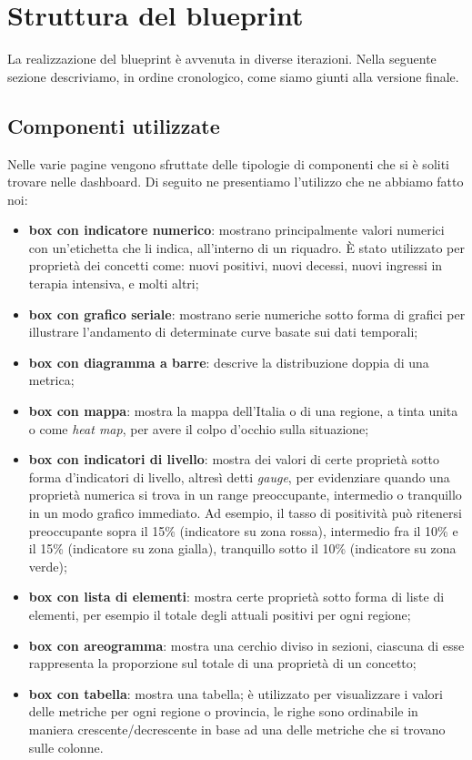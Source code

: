 \section{Struttura del blueprint}\label{s:struttura-blueprint}
La realizzazione del blueprint è avvenuta in diverse iterazioni. Nella seguente sezione descriviamo, in ordine cronologico, come siamo giunti alla versione finale.

\subsection{Componenti utilizzate}\label{ss:componenti-utilizzate}
Nelle varie pagine vengono sfruttate delle tipologie di componenti che si è soliti trovare nelle dashboard. Di seguito ne presentiamo l'utilizzo che ne abbiamo fatto noi:
\begin{itemize}
    \item \textbf{box con indicatore numerico}: mostrano principalmente valori numerici con un'etichetta che li indica, all'interno di un riquadro. È stato utilizzato per proprietà dei concetti come: nuovi positivi, nuovi decessi, nuovi ingressi in terapia intensiva, e molti altri;
    \item \textbf{box con grafico seriale}: mostrano serie numeriche sotto forma di grafici per illustrare l'andamento di determinate curve basate sui dati temporali;
    \item \textbf{box con diagramma a barre}: descrive la distribuzione doppia di una metrica;
    \item \textbf{box con mappa}: mostra la mappa dell'Italia o di una regione, a tinta unita o come \textit{heat map}, per avere il colpo d'occhio sulla situazione;
    \item \textbf{box con indicatori di livello}: mostra dei valori di certe proprietà sotto forma d'indicatori di livello, altresì detti \textit{gauge}, per evidenziare quando una proprietà numerica si trova in un range preoccupante, intermedio o tranquillo in un modo grafico immediato. Ad esempio, il tasso di positività può ritenersi preoccupante sopra il 15\% (indicatore su zona rossa), intermedio fra il 10\% e il 15\% (indicatore su zona gialla), tranquillo sotto il 10\% (indicatore su zona verde);
    \item \textbf{box con lista di elementi}: mostra certe proprietà sotto forma di liste di elementi, per esempio il totale degli attuali positivi per ogni regione;
    \item \textbf{box con areogramma}: mostra una cerchio diviso in sezioni, ciascuna di esse rappresenta la proporzione sul totale di una proprietà di un concetto;
    \item \textbf{box con tabella}: mostra una tabella; è utilizzato per visualizzare i valori delle metriche per ogni regione o provincia, le righe sono ordinabile in maniera crescente/decrescente in base ad una delle metriche che si trovano sulle colonne.
\end{itemize}

